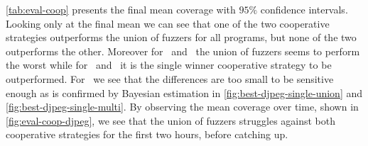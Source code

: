 \autoref{tab:eval-coop} presents the final mean coverage with $95\%$ confidence
intervals. Looking only at the final mean we can see that one of the two
cooperative strategies outperforms the union of fuzzers for all programs, but
none of the two outperforms the other. Moreover for \djpeg\ and \objdump\ the
union of fuzzers seems to perform the worst while for \tiffpdf\ and \listswf\ it
is the single winner cooperative strategy to be outperformed. For \djpeg\ we see
that the differences are too small to be sensitive enough as is confirmed by
Bayesian estimation in \autoref{fig:best-djpeg-single-union} and
\autoref{fig:best-djpeg-single-multi}. By observing the mean coverage over time,
shown in \autoref{fig:eval-coop-djpeg}, we see that the union of fuzzers
struggles against both cooperative strategies for the first two hours, before
catching up.

